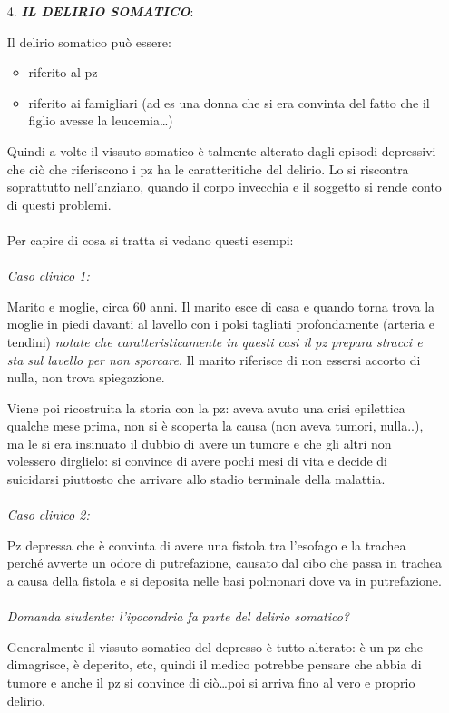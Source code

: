 \begin{itemize}
\item[4.]
  \textbf{\emph{IL DELIRIO SOMATICO}}:

Il delirio somatico può essere:

\begin{itemize}
\item
  riferito al pz
\item
  riferito ai famigliari (ad es una donna che si era convinta del fatto
  che il figlio avesse la leucemia\ldots{})
\end{itemize}

Quindi a volte il vissuto somatico è talmente alterato dagli episodi
depressivi che ciò che riferiscono i pz ha le caratteritiche del
delirio. Lo si riscontra soprattutto nell'anziano, quando il corpo
invecchia e il soggetto si rende conto di questi problemi.
\\\\
Per capire di cosa si tratta si vedano questi esempi:
\\\\
\emph{Caso clinico 1:}

Marito e moglie, circa 60 anni. Il marito esce di casa e quando torna
trova la moglie in piedi davanti al lavello con i polsi tagliati
profondamente (arteria e tendini) \emph{notate che caratteristicamente
in questi casi il pz prepara stracci e sta sul lavello per non
sporcare}. Il marito riferisce di non essersi accorto di nulla, non
trova spiegazione.

Viene poi ricostruita la storia con la pz: aveva avuto una crisi
epilettica qualche mese prima, non si è scoperta la causa (non aveva
tumori, nulla..), ma le si era insinuato il dubbio di avere un tumore e
che gli altri non volessero dirglielo: si convince di avere pochi mesi
di vita e decide di suicidarsi piuttosto che arrivare allo stadio
terminale della malattia.
\\\\
\emph{Caso clinico 2:}

Pz depressa che è convinta di avere una fistola tra l'esofago e la
trachea perché avverte un odore di putrefazione, causato dal cibo che
passa in trachea a causa della fistola e si deposita nelle basi
polmonari dove va in putrefazione.
\\\\
\emph{Domanda studente: l'ipocondria fa parte del delirio somatico?}

Generalmente il vissuto somatico del depresso è tutto alterato: è un pz
che dimagrisce, è deperito, etc, quindi il medico potrebbe pensare che
abbia di tumore e anche il pz si convince di ciò\ldots{}poi si arriva
fino al vero e proprio delirio.
\end{itemize}

